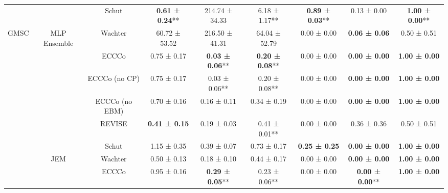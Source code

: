 \begin{table}
{\begin{tabular}[t]{ccccccccc}
 &  & Schut & \textbf{0.61 ± 0.24}** & 214.74 ± 34.33\hphantom{*}\hphantom{*} & 6.18 ± 1.17** & \textbf{0.89 ± 0.03}** & 0.13 ± 0.00\hphantom{*}\hphantom{*} & \textbf{1.00 ± 0.00}**\\

\multirow[t]{-16}{*}{\centering\arraybackslash GMSC} & \multirow[t]{-4}{*}{\centering\arraybackslash MLP Ensemble} & Wachter & 60.72 ± 53.52\hphantom{*}\hphantom{*} & 216.50 ± 41.31\hphantom{*}\hphantom{*} & 64.04 ± 52.79\hphantom{*}\hphantom{*} & 0.00 ± 0.00\hphantom{*}\hphantom{*} & \textbf{0.06 ± 0.06}\hphantom{*}\hphantom{*} & 0.50 ± 0.51\hphantom{*}\hphantom{*}\\
\cmidrule{1-9}
 &  & ECCCo & 0.75 ± 0.17\hphantom{*}\hphantom{*} & \textbf{0.03 ± 0.06}** & \textbf{0.20 ± 0.08}** & 0.00 ± 0.00\hphantom{*}\hphantom{*} & \textbf{0.00 ± 0.00}\hphantom{*}\hphantom{*} & \textbf{1.00 ± 0.00}\hphantom{*}\hphantom{*}\\

 &  & ECCCo (no CP) & 0.75 ± 0.17\hphantom{*}\hphantom{*} & 0.03 ± 0.06** & 0.20 ± 0.08** & 0.00 ± 0.00\hphantom{*}\hphantom{*} & \textbf{0.00 ± 0.00}\hphantom{*}\hphantom{*} & \textbf{1.00 ± 0.00}\hphantom{*}\hphantom{*}\\

 &  & ECCCo (no EBM) & 0.70 ± 0.16\hphantom{*}\hphantom{*} & 0.16 ± 0.11\hphantom{*}\hphantom{*} & 0.34 ± 0.19\hphantom{*}\hphantom{*} & 0.00 ± 0.00\hphantom{*}\hphantom{*} & \textbf{0.00 ± 0.00}\hphantom{*}\hphantom{*} & \textbf{1.00 ± 0.00}\hphantom{*}\hphantom{*}\\

 &  & REVISE & \textbf{0.41 ± 0.15}\hphantom{*}\hphantom{*} & 0.19 ± 0.03\hphantom{*}\hphantom{*} & 0.41 ± 0.01** & 0.00 ± 0.00\hphantom{*}\hphantom{*} & 0.36 ± 0.36\hphantom{*}\hphantom{*} & 0.50 ± 0.51\hphantom{*}\hphantom{*}\\

 &  & Schut & 1.15 ± 0.35\hphantom{*}\hphantom{*} & 0.39 ± 0.07\hphantom{*}\hphantom{*} & 0.73 ± 0.17\hphantom{*}\hphantom{*} & \textbf{0.25 ± 0.25}\hphantom{*}\hphantom{*} & \textbf{0.00 ± 0.00}\hphantom{*}\hphantom{*} & \textbf{1.00 ± 0.00}\hphantom{*}\hphantom{*}\\

 & \multirow[t]{-6}{*}{\centering\arraybackslash JEM} & Wachter & 0.50 ± 0.13\hphantom{*}\hphantom{*} & 0.18 ± 0.10\hphantom{*}\hphantom{*} & 0.44 ± 0.17\hphantom{*}\hphantom{*} & 0.00 ± 0.00\hphantom{*}\hphantom{*} & \textbf{0.00 ± 0.00}\hphantom{*}\hphantom{*} & \textbf{1.00 ± 0.00}\hphantom{*}\hphantom{*}\\
\cmidrule{2-9}
 &  & ECCCo & 0.95 ± 0.16\hphantom{*}\hphantom{*} & \textbf{0.29 ± 0.05}** & 0.23 ± 0.06** & 0.00 ± 0.00\hphantom{*}\hphantom{*} & \textbf{0.00 ± 0.00}** & \textbf{1.00 ± 0.00}\hphantom{*}\hphantom{*}\\


\end{tabular}}
\end{table}
